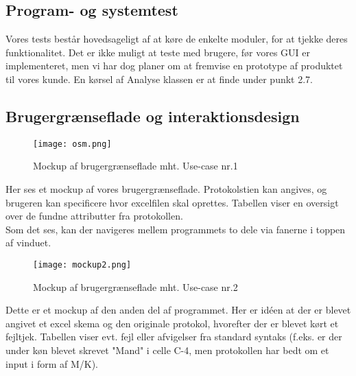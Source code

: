 \documentclass[11pt]{article}
\begin{document}
\subsection{Program- og systemtest}
Vores tests består hovedsageligt af at køre de enkelte moduler, for at tjekke deres funktionalitet. Det er ikke muligt at teste med brugere, før vores GUI er implementeret, men vi har dog planer om at fremvise en prototype af produktet til vores kunde. En kørsel af Analyse klassen er at finde under punkt 2.7.

\subsection{Brugergrænseflade og interaktionsdesign}
\begin{figure}[H]
\texttt{[image: osm.png]}
\caption{Mockup af brugergrænseflade mht. Use-case nr.1}
\end{figure}
Her ses et mockup af vores brugergrænseflade. Protokolstien kan angives, og brugeren kan specificere hvor excelfilen skal oprettes. Tabellen viser en oversigt over de fundne attributter fra protokollen.\\
Som det ses, kan der navigeres mellem programmets to dele via fanerne i toppen af vinduet.
\begin{figure}[H]
\texttt{[image: mockup2.png]}
\caption{Mockup af brugergrænseflade mht. Use-case nr.2}
\end{figure}

Dette er et mockup af den anden del af programmet. Her er idéen at der er blevet angivet et excel skema og den originale protokol, hvorefter der er blevet kørt et fejltjek. Tabellen viser evt. fejl eller afvigelser fra standard syntaks (f.eks. er der under køn blevet skrevet "Mand" i celle C-4, men protokollen har bedt om et input i form af M/K).
\pagebreak
\end{document}
